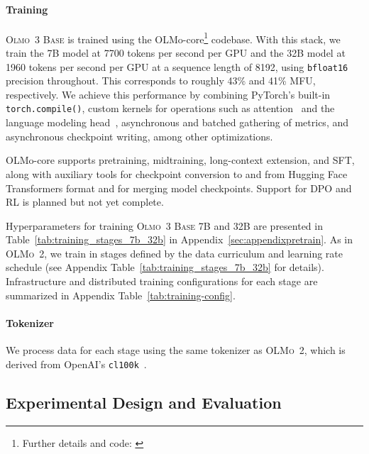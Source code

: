 \documentclass[table]{ai2style/ai2}
\newcommand{\oldOlmo}{OLMo\xspace}
\newcommand{\newOlmo}{Olmo\xspace}
\newcommand{\olmotoo}{\textsc{\oldOlmo~2}\xspace}
\newcommand{\olmothreebase}{\textsc{\newOlmo~3 Base}\xspace}
\newcommand{\olmocore}{{\oldOlmo-core}\xspace}
\begin{document}
\paragraph{Training}
\olmothreebase is trained using the \olmocore\footnote{Further details and code: \href{https://github.com/allenai/OLMo-core}{}} codebase.
With this stack, we train the 7B model at 7700 tokens per second per GPU and the 32B model at 1960 tokens per second per GPU at a sequence length of 8192, using \texttt{bfloat16} precision throughout. This corresponds to roughly 43\% and 41\% MFU, respectively. We achieve this performance by combining PyTorch's built-in \texttt{torch.compile()}, custom kernels for operations such as attention~\citep{dao2023flashattention2} and the language modeling head~\citep{hsu2025ligerkernelefficienttriton}, asynchronous and batched gathering of metrics, and asynchronous checkpoint writing, among other optimizations.

\olmocore supports pretraining, midtraining, long-context extension, and SFT, along with auxiliary tools for checkpoint conversion to and from Hugging Face Transformers format and for merging model checkpoints. Support for DPO and RL is planned but not yet complete.

Hyperparameters for training \olmothreebase 7B and 32B are presented in Table~\ref{tab:training_stages_7b_32b} in Appendix~\ref{sec:appendixpretrain}. As in \olmotoo, we train in stages defined by the data curriculum and learning rate schedule (see Appendix Table~\ref{tab:training_stages_7b_32b} for details).
Infrastructure and distributed training configurations for each stage are summarized in Appendix Table~\ref{tab:training-config}.

\paragraph{Tokenizer} We process data for each stage using the same tokenizer as \olmotoo, which is derived from OpenAI's \texttt{cl100k}~\citep{gpt35,gpt4}.

\subsection{Experimental Design and Evaluation}\label{sec:experimental-design}
\end{document}
